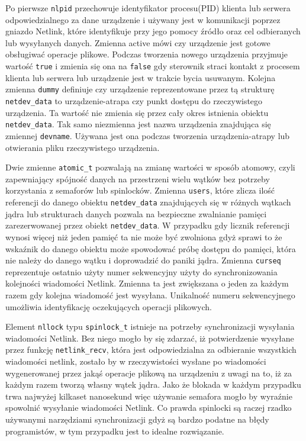 \documentclass[10pt]{article}
\begin{document}
Po pierwsze \texttt{nlpid} przechowuje identyfikator procesu(PID) klienta lub serwera odpowiedzialnego za dane urządzenie i używany jest w komunikacji poprzez gniazdo Netlink, które identyfikuje przy jego pomocy źródło oraz cel odbieranych lub wysyłanych danych. Zmienna active mówi czy urządzenie jest gotowe obsługiwać operacje plikowe. Podczas tworzenia nowego urządzenia przyjmuje wartość \texttt{true} i zmienia się ona na \texttt{false} gdy sterownik straci kontakt z procesem klienta lub serwera lub urządzenie jest w trakcie bycia usuwanym.  Kolejna zmienna \texttt{dummy} definiuje czy urządzenie reprezentowane przez tą strukturę \texttt{netdev\_data} to urządzenie-atrapa czy punkt dostępu do rzeczywistego urządzenia. Ta wartość nie zmienia się przez cały okres istnienia obiektu \texttt{netdev\_data}. Tak samo niezmienna jest nazwa urządzenia znajdująca się zmiennej \texttt{devname}. Używana jest ona podczas tworzenia urządzenia-atrapy lub otwierania pliku rzeczywistego urządzenia.

Dwie zmienne \texttt{atomic\_t} pozwalają na zmianę wartości w sposób atomowy, czyli zapewniający spójność danych na przestrzeni wielu wątków bez potrzeby korzystania z semaforów lub spinlocków. Zmienna \texttt{users}, które zlicza ilość referencji do danego obiektu \texttt{netdev\_data} znajdujących się w różnych wątkach jądra lub strukturach danych pozwala na bezpieczne zwalnianie pamięci zarezerwowanej przez obiekt \texttt{netdev\_data}. W przypadku gdy licznik referencji wynosi więcej niż jeden pamięć ta nie może być zwolniona gdyż sprawi to że wskaźnik do danego obiektu może spowodować próbę dostępu do pamięci, która nie należy do danego wątku i doprowadzić do paniki jądra. Zmienna \texttt{curseq} reprezentuje ostatnio użyty numer sekwencyjny użyty do synchronizowania kolejności wiadomości Netlink. Zmienna ta jest zwiększana o jeden za każdym razem gdy kolejna wiadomość jest wysyłana. Unikalność numeru sekwencyjnego umożliwia identyfikację oczekujących operacji plikowych.

Element \texttt{nllock} typu \texttt{spinlock\_t} istnieje na potrzeby synchronizacji wysyłania wiadomości Netlink. Bez niego mogło by się zdarzać, iż potwierdzenie wysyłane przez funkcję \texttt{netlink\_recv}, która jest odpowiedzialna za odbieranie wszystkich wiadomości netlink, zostało by w rzeczywistości wysłane po wiadomości wygenerowanej przez jakąś operacje plikową na urządzeniu z uwagi na to, iż za każdym razem tworzą własny wątek jądra. Jako że blokada w każdym przypadku trwa najwyżej kilkaset nanosekund więc używanie semafora mogło by wyraźnie spowolnić wysyłanie wiadomości Netlink. Co prawda spinlocki są raczej rzadko używanymi narzędziami synchronizacji gdyż są bardzo podatne na błędy programistów, w tym przypadku jest to idealne rozwiązanie.
\end{document}
